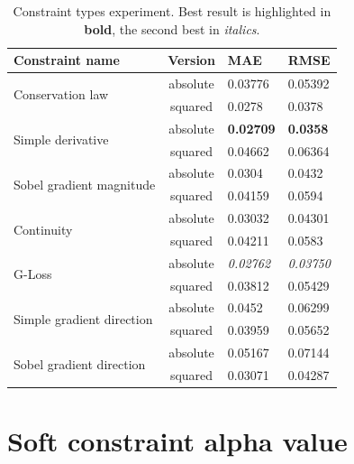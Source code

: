 {
\shorthandoff{-}
\begin{table}[htbp]
    \centering
    \begin{tabular}{|l|c|l|l|}
        \hline
        \textbf{Constraint name} & \textbf{Version} & \textbf{MAE} & \textbf{RMSE} \\ 
        \hline
        \hline
        \multirow{2}{*}{Conservation law} & absolute & 0.03776 & 0.05392 \\ 
        \cline{2-4}
        & squared & 0.0278 & 0.0378 \\         
        \hline
        \multirow{2}{*}{Simple derivative} & absolute & \textbf{0.02709} & \textbf{0.0358} \\ 
        \cline{2-4}
        & squared & 0.04662 & 0.06364 \\         
        \hline
        \multirow{2}{*}{Sobel gradient magnitude} & absolute & 0.0304 & 0.0432 \\ 
        \cline{2-4}
        & squared & 0.04159 & 0.0594 \\         
        \hline
        \multirow{2}{*}{Continuity} & absolute & 0.03032 & 0.04301 \\ 
        \cline{2-4}
        & squared & 0.04211 & 0.0583 \\         
        \hline
        \multirow{2}{*}{G-Loss} & absolute & \textit{0.02762} & \textit{0.03750} \\ 
        \cline{2-4}
        & squared & 0.03812 & 0.05429 \\         
        \hline
        \multirow{2}{*}{Simple gradient direction} & absolute & 0.0452 & 0.06299 \\ 
        \cline{2-4}
        & squared & 0.03959 & 0.05652 \\         
        \hline
        \multirow{2}{*}{Sobel gradient direction} & absolute & 0.05167 & 0.07144 \\ 
        \cline{2-4}
        & squared & 0.03071 & 0.04287 \\         
        \hline
    \end{tabular}
    \caption[Constraint types experiment]{Constraint types experiment. Best result is highlighted in \textbf{bold}, the second best in \textit{italics}.}
    \label{tab:soft_constraints_exp}
\end{table}
}

\section{Soft constraint alpha value}
\label{s:soft_constraints_alpha_exp}

